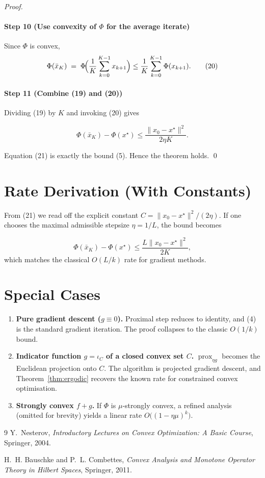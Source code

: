 \documentclass{article}
\newcommand{\prox}{\operatorname{prox}}
\begin{document}
\begin{proof}
\paragraph{Step 10 (Use convexity of $\Phi$ for the average iterate)}
Since $\Phi$ is convex,
\[
\Phi(\bar{x}_{K})\;=\;\Phi\!\Bigl(\frac{1}{K}\sum_{k=0}^{K-1}x_{k+1}\Bigr)
\le\frac{1}{K}\sum_{k=0}^{K-1}\Phi(x_{k+1}).
\tag{20}
\]

\paragraph{Step 11 (Combine (19) and (20))}
Dividing (19) by $K$ and invoking (20) gives

\[
\Phi(\bar{x}_{K})-\Phi(x^{\star})
\le\frac{\|x_{0}-x^{\star}\|^{2}}{2\eta K}.
\tag{21}
\]

Equation (21) is exactly the bound (5).  Hence the theorem holds. \qed
\end{proof}

\section*{Rate Derivation (With Constants)}
From (21) we read off the explicit constant $C=\|x_{0}-x^{\star}\|^{2}/(2\eta)$.  
If one chooses the maximal admissible stepsize $\eta=1/L$, the bound becomes

\[
\Phi(\bar{x}_{K})-\Phi(x^{\star})\le\frac{L\|x_{0}-x^{\star}\|^{2}}{2K},
\tag{22}
\]
which matches the classical $O(L/k)$ rate for gradient methods.

\section*{Special Cases}
\begin{enumerate}[noitemsep]
  \item \textbf{Pure gradient descent ($g\equiv0$).}  
        Proximal step reduces to identity, and (4) is the standard gradient iteration. The proof collapses to the classic $O(1/k)$ bound.
  \item \textbf{Indicator function $g=\iota_{C}$ of a closed convex set $C$.}  
        $\prox_{\eta g}$ becomes the Euclidean projection onto $C$. The algorithm is projected gradient descent, and Theorem~\ref{thm:ergodic} recovers the known rate for constrained convex optimisation.
  \item \textbf{Strongly convex $f+g$.}  
        If $\Phi$ is $\mu$‑strongly convex, a refined analysis (omitted for brevity) yields a linear rate $O\big((1-\eta\mu)^{k}\big)$.
\end{enumerate}

\begin{thebibliography}{9}
Y.~Nesterov,
\emph{Introductory Lectures on Convex Optimization: A Basic Course},
Springer, 2004.

H.~H. Bauschke and P.~L. Combettes,
\emph{Convex Analysis and Monotone Operator Theory in Hilbert Spaces},
Springer, 2011.
\end{thebibliography}
\end{document}
